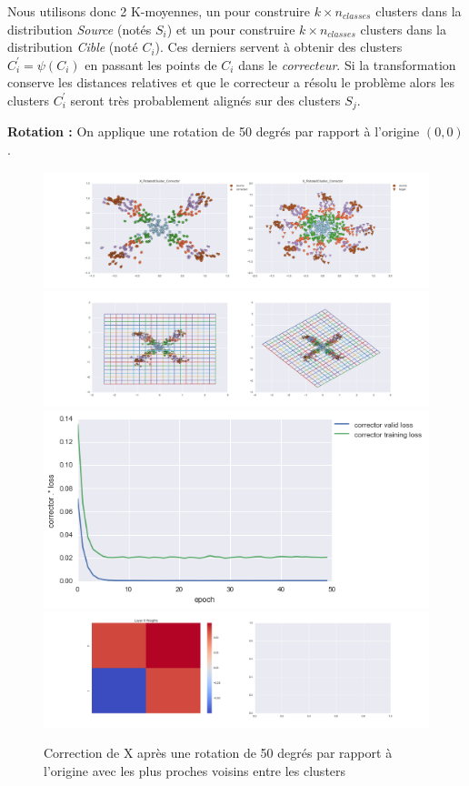 Nous utilisons donc 2 K-moyennes, un pour construire $k\times n_{classes}$ clusters 
dans la distribution \emph{Source} (notés $S_i$) et un pour construire $k\times n_{classes}$ 
clusters dans la distribution \emph{Cible} (noté $C_i$). Ces derniers servent à obtenir 
des clusters $C_i^\prime = \psi(C_i)$ en passant les points de $C_i$ dans le \emph{correcteur}.
Si la transformation conserve les distances relatives et que le correcteur a résolu le problème
alors les clusters $C_i^\prime$ seront très probablement alignés sur des clusters $S_j$.

{\Large \textbf{Rotation :}} On applique une rotation de 50 degrés par rapport à l'origine $(0,0)$.

\begin{figure}[H] %
\centering
\includegraphics[width=\linewidth]{fig/24-05-2016/X/X_RotatedCluster_Corrector-DATA.png}
\includegraphics[width=\linewidth]{fig/24-05-2016/X/X_RotatedCluster_Corrector-GridCheck.png}
\includegraphics[width=0.45\linewidth]{fig/24-05-2016/X/X_RotatedCluster_Corrector-Learning_curve.png}
\includegraphics[width=\linewidth]{fig/24-05-2016/X/X_RotatedCluster_Corrector-W.png}
\caption{Correction de X après une rotation de 50 degrés par rapport à l'origine avec les plus proches voisins entre les clusters}
\label{fig:recap-X-rot-cluster}
\end{figure}

